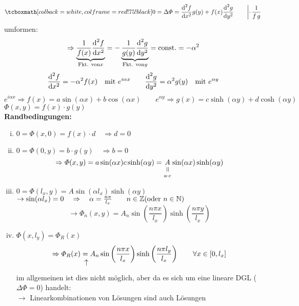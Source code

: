 \begin{equation*}
\rmbox{0 = \Delta \Phi = \prd{^2 f}{x^2} g(y) + f(x) \prd{^2 g}{y^2} } \qquad \left\rvert \cdot \, \frac{1}{f\,g} \right.
\end{equation*}
umformen:
\begin{equation*}
\Rightarrow \underbrace{\frac{1}{f(x)} \frac{\textrm{d} ^2 f}{\textrm{d} x^2}}_{\textrm{Fkt. von} x} = - \underbrace{\frac{1}{g(y)} \frac{\textrm{d} ^2 g}{\textrm{d} y^2}}_{\textrm{Fkt. von} y} = \textrm{const.} = - \alpha ^2
\end{equation*}
\begin{equation*}
\frac{\textrm{d} ^2 f}{\textrm{d} x^2} = - \alpha^2 f(x) \quad \textrm{mit } e^{i\alpha x} \qquad \frac{\textrm{d} ^2 g}{\textrm{d} y^2} = \alpha^2 g(y) \quad \textrm{mit } e^{\alpha y}
\end{equation*}
\begin{equation*}
e^{i \alpha x} \Rightarrow f(x) = a \sin(\alpha x) + b \cos(\alpha x) \qquad e^{\alpha y} \Rightarrow g(x) = c \sinh(\alpha y) + d \cosh(\alpha y)
\end{equation*}
$ \Phi(x,y) = f(x) \cdot g(y) $\\[5pt]
\textbf{Randbedingungen:}
\begin{enumerate}[i)]
	\item $ 0 = \Phi(x,0) = f(x) \cdot d \quad \Rightarrow d = 0 $
	\item $ 0 = \Phi(0,y) = b \cdot g(y) \quad \Rightarrow b = 0 $
	\begin{equation*}
	\Rightarrow \Phi(x,y) = a \sin(\alpha x) c \sinh(\alpha y) = \equalto{A}{a\cdot c} \sin(\alpha x) \sinh(\alpha y)
	\end{equation*}
	\item $ 0 = \Phi(l_x,y) = A \sin(\alpha l_x) \sinh(\alpha y) $
	$ \rightarrow \sin(\alpha l_x) = 0 \quad \Rightarrow \quad \alpha = \frac{n \pi}{l_x} \qquad n \in \mathbb{Z} (\textrm{oder } n \in \mathbb{N}) $
	\begin{equation*}
	\rightarrow \Phi_n(x,y) = A_n \sin\left(\frac{n \pi x}{l_x}\right) \sinh\left(\frac{n \pi y}{l_x}\right)
	\end{equation*}
	\item $ \Phi(x,l_y) = \Phi_R(x) $
	\begin{equation*}
	\Rightarrow \Phi_R(x) \custo{\leftarrow}{=}{} A_n \sin\left(\frac{n \pi x}{l_x}\right) \sinh\left(\frac{n \pi l_y}{l_x}\right) \qquad \forall x \in [0,l_x]
	\end{equation*}
	im allgemeinen ist dies nicht möglich, aber da es sich um eine lineare DGL ($ \Delta \Phi = 0 $) handelt:\\
	$ \rightarrow $ Linearkombinationen von Lösungen sind auch Lösungen
\end{enumerate}
